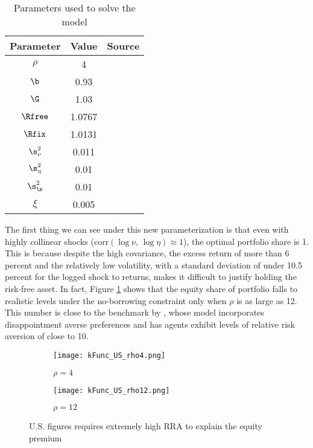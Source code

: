 \begin{table}[htbp]
    \begin{tabular}{ccc}
        \toprule
        Parameter & Value & Source\\
        \midrule
        $\rho$ & 4\\
        $\b$ & 0.93\\
        $\G$ & 1.03 & \citet{Carroll1992}\\
        $\Rfree$ & 1.0767 & \citet{Mehra2006}\\
        $\Rfix$ & 1.0131 & \citet{Mehra2006}\\
        $\s_{\nu}^2$ & 0.011 & \citet{Mehra2006}\\
        $\s_{\eta}^2$ & 0.01 & \citet{Carroll1992}\\
        $\s_{\z}^2$ & 0.01 & \citet{Carroll1992}\\
        $\xi$ & 0.005 & \citet{Carroll1992}\\
        \bottomrule
    \end{tabular}
    \caption{Parameters used to solve the model}
    \label{tab:model_parameters}
\end{table}

The first thing we can see under this new parameterization is that even with highly collinear shocks ($\text{corr}(\log\nu,\,\log\eta) \approx 1$), the optimal portfolio share is 1. This is because despite the high covariance, the excess return of more than 6 percent and the relatively low volatility, with a standard deviation of under 10.5 percent for the logged shock to returns, makes it difficult to justify holding the risk-free asset. In fact, Figure \ref{fig:US_rho_comparison} shows that the equity share of portfolio falls to realistic levels under the no-borrowing constraint only when $\rho$ is as large as 12. This number is close to the benchmark by \citet{Schreindorfer2020}, whose model incorporates disappointment averse preferences and has agents exhibit levels of relative risk aversion of close to 10.

\begin{figure}[h]
    \centering
    \begin{subfigure}{0.49\textwidth}
        \centering
        \texttt{[image: kFunc\_US\_rho4.png]}
        \caption{$\rho = 4$}
    \end{subfigure}
    \begin{subfigure}{0.49\textwidth}
        \centering
        \texttt{[image: kFunc\_US\_rho12.png]}
        \caption{$\rho = 12$}
    \end{subfigure}
    \caption{U.S. figures requires extremely high RRA to explain the equity premium}
    \label{fig:US_rho_comparison}
\end{figure}

